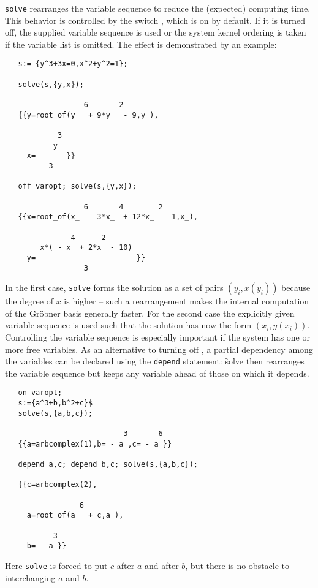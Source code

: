 \hypertarget{switch:VAROPT}{}
\texttt{solve} rearranges the variable sequence
to reduce the (expected) computing time. This behavior is controlled
by the switch , which is on by default.
If it is turned off, the supplied variable sequence is used
or the system kernel ordering is taken if the variable
list is omitted. The effect is demonstrated by an example:
\begin{verbatim}
   s:= {y^3+3x=0,x^2+y^2=1};

   solve(s,{y,x});

                  6       2
   {{y=root_of(y_  + 9*y_  - 9,y_),

            3
         - y
     x=-------}}
          3

   off varopt; solve(s,{y,x});

                  6       4        2
   {{x=root_of(x_  - 3*x_  + 12*x_  - 1,x_),

               4      2
        x*( - x  + 2*x  - 10)
     y=-----------------------}}
                  3

\end{verbatim}
In the first case, \texttt{solve} forms the solution as a set of
pairs $(y_i,x(y_i))$ because the degree of $x$ is higher --
such a rearrangement makes the internal computation of the Gr\"obner basis
generally faster. For the second case the explicitly given variable sequence
is used such that the solution has now the form $(x_i,y(x_i))$.
Controlling the variable sequence is especially important if
the system has one or more free variables.
As an alternative to turning off , a partial dependency among
the variables can be declared using the \texttt{depend}
statement: \f{solve} then rearranges the variable sequence but keeps any
variable ahead of those on which it depends.
\begin{verbatim}
   on varopt;
   s:={a^3+b,b^2+c}$
   solve(s,{a,b,c});

                           3       6
   {{a=arbcomplex(1),b= - a ,c= - a }}

   depend a,c; depend b,c; solve(s,{a,b,c});

   {{c=arbcomplex(2),

                 6
     a=root_of(a_  + c,a_),

           3
     b= - a }}
\end{verbatim}
Here \texttt{solve} is forced to put $c$ after $a$ and after $b$, but
there is no obstacle to interchanging $a$ and $b$.
